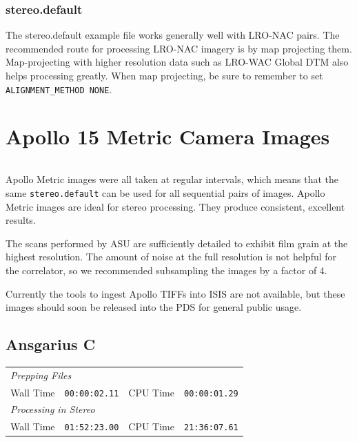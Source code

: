 \subsubsection*{stereo.default}

The stereo.default example file works generally well with LRO-NAC
pairs. The recommended route for processing LRO-NAC imagery is by map
projecting them. Map-projecting with higher resolution data such as
LRO-WAC Global DTM also helps processing greatly. When map projecting,
be sure to remember to set \texttt{ALIGNMENT\_METHOD NONE}.

\section{Apollo 15 Metric Camera Images}

\begin{tabular}{ r c r c}

\end{tabular}

Apollo Metric images were all taken at regular intervals, which means
that the same \texttt{stereo.default} can be used for all sequential pairs of
images. Apollo Metric images are ideal for stereo processing.  They
produce consistent, excellent results.

The scans performed by ASU are sufficiently detailed to exhibit film
grain at the highest resolution.  The amount of noise at the full
resolution is not helpful for the correlator, so we recommended
subsampling the images by a factor of 4.

Currently the tools to ingest Apollo TIFFs into ISIS are not
available, but these images should soon be released into the PDS for
general public usage.

\subsection{Ansgarius C}

\begin{tabular}{ r c r c}
\multicolumn{3}{l}{ \emph{Prepping Files} } \\
Wall Time & \texttt{00:00:02.11} & CPU Time & \texttt{00:00:01.29} \\
\multicolumn{3}{l}{ \emph{Processing in Stereo} } \\
Wall Time & \texttt{01:52:23.00} & CPU Time & \texttt{21:36:07.61} \\
\end{tabular}

